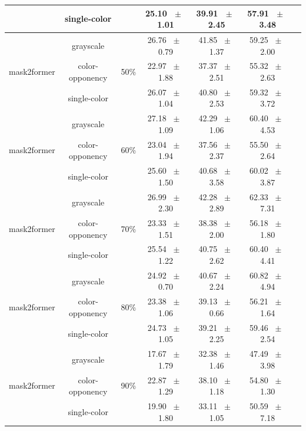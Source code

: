 \begin{table}[h]
\begin{tabular}{@{}lccc ccc@{}}
    & single-color &  & 25.10 ~$\pm$~ 1.01 & 39.91 ~$\pm$~ 2.45 & 57.91 ~$\pm$~ 3.48 \\
    \midrule
    \multirow{3}{*}{mask2former} & grayscale & \multirow{3}{*}{50\%} & 26.76 ~$\pm$~ 0.79 & 41.85 ~$\pm$~ 1.37 & 59.25 ~$\pm$~ 2.00 \\
    & color-opponency &  & 22.97 ~$\pm$~ 1.88 & 37.37 ~$\pm$~ 2.51 & 55.32 ~$\pm$~ 2.63 \\
    & single-color &  & 26.07 ~$\pm$~ 1.04 & 40.80 ~$\pm$~ 2.53 & 59.32 ~$\pm$~ 3.72 \\
    \midrule
    \multirow{3}{*}{mask2former} & grayscale & \multirow{3}{*}{60\%} & 27.18 ~$\pm$~ 1.09 & 42.29 ~$\pm$~ 1.06 & 60.40 ~$\pm$~ 4.53 \\
    & color-opponency &  & 23.04 ~$\pm$~ 1.94 & 37.56 ~$\pm$~ 2.37 & 55.50 ~$\pm$~ 2.64 \\
    & single-color &  & 25.60 ~$\pm$~ 1.50 & 40.68 ~$\pm$~ 3.58 & 60.02 ~$\pm$~ 3.87 \\
    \midrule
    \multirow{3}{*}{mask2former} & grayscale & \multirow{3}{*}{70\%} & 26.99 ~$\pm$~ 2.30 & 42.28 ~$\pm$~ 2.89 & 62.33 ~$\pm$~ 7.31 \\
    & color-opponency &  & 23.33 ~$\pm$~ 1.51 & 38.38 ~$\pm$~ 2.00 & 56.18 ~$\pm$~ 1.80 \\
    & single-color &  & 25.54 ~$\pm$~ 1.22 & 40.75 ~$\pm$~ 2.62 & 60.40 ~$\pm$~ 4.41 \\
    \midrule
    \multirow{3}{*}{mask2former} & grayscale & \multirow{3}{*}{80\%} & 24.92 ~$\pm$~ 0.70 & 40.67 ~$\pm$~ 2.24 & 60.82 ~$\pm$~ 4.94 \\
    & color-opponency &  & 23.38 ~$\pm$~ 1.06 & 39.13 ~$\pm$~ 0.66 & 56.21 ~$\pm$~ 1.64 \\
    & single-color &  & 24.73 ~$\pm$~ 1.05 & 39.21 ~$\pm$~ 2.25 & 59.46 ~$\pm$~ 2.54 \\
    \midrule
    \multirow{3}{*}{mask2former} & grayscale & \multirow{3}{*}{90\%} & 17.67 ~$\pm$~ 1.79 & 32.38 ~$\pm$~ 1.46 & 47.49 ~$\pm$~ 3.98 \\
    & color-opponency &  & 22.87 ~$\pm$~ 1.29 & 38.10 ~$\pm$~ 1.18 & 54.80 ~$\pm$~ 1.30 \\
    & single-color &  & 19.90 ~$\pm$~ 1.80 & 33.11 ~$\pm$~ 1.05 & 50.59 ~$\pm$~ 7.18 \\
    \midrule
    \bottomrule
  \end{tabular}
  \label{tab:sparse_results_mask2former_dark_zurich}
\end{table}